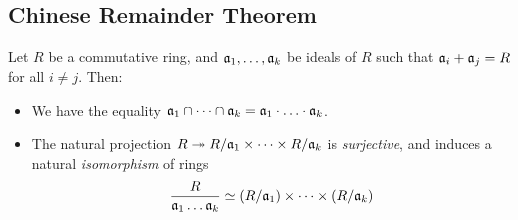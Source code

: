 \subsection{Chinese Remainder Theorem}

\begin{theorem}
    \label{thm:chinese-remainder-theorem}
    Let \(R\) be a commutative ring, and \(\mathfrak{a}_1, \dots, \mathfrak{a}_k\)
    be ideals of \(R\) such that \(\mathfrak{a}_i + \mathfrak{a}_j = R\) for all
    \(i \neq j\). Then:
    \begin{itemize}\setlength\itemsep{0em}
        \item We have the equality \(\mathfrak{a}_1 \cap \dots \cap \mathfrak{a}_k =
              \mathfrak{a}_1 \cdot \ldots \cdot \mathfrak{a}_k\).
        \item The natural projection
              \(R \twoheadrightarrow R/\mathfrak{a}_1 \times \dots \times R/\mathfrak{a}_k\) is
              \emph{surjective}, and induces a natural \emph{isomorphism} of rings
              \[
                  \frac{R}{\mathfrak{a}_1 \dots \mathfrak{a}_k}
                  \simeq (R/\mathfrak{a}_1) \times \dots \times (R/\mathfrak{a}_{k})
              \]
    \end{itemize}
\end{theorem}

